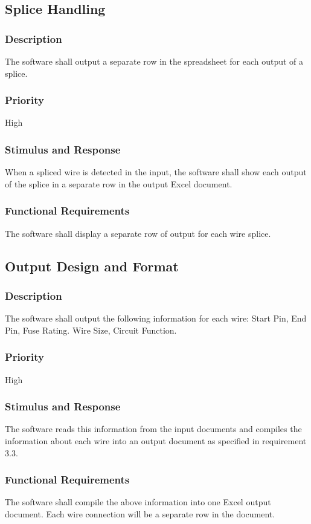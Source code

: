  \subsection{Splice Handling}
\subsubsection{Description}
 The software shall output a separate row in the spreadsheet for each output of a splice.
\subsubsection{Priority}
High

\subsubsection{Stimulus and Response}
When a spliced wire is detected in the input, the software shall show each output of the splice in a separate row in the output Excel document.

\subsubsection{Functional Requirements}
The software shall display a separate row of output for each wire splice.

 
  \subsection{Output Design and Format}
\subsubsection{Description}
The software shall output the following information for each wire:
Start Pin, End Pin, Fuse Rating. Wire Size, Circuit Function.
\subsubsection{Priority}
High

\subsubsection{Stimulus and Response}
The software reads this information from the input documents and compiles the information about each wire into an output document  as specified in requirement 3.3.

\subsubsection{Functional Requirements}
 The software shall compile the above information into one Excel output document. Each wire connection will be a separate row in the document.
 
